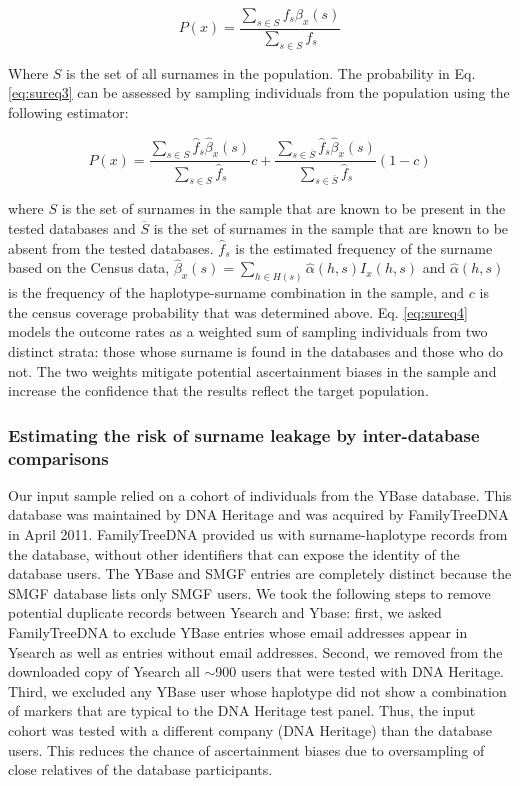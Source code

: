 \begin{equation}
\label{eq:sureq3}
P(x) = \frac
{\sum_{s \in S} f_s \beta_x(s)}
{\sum_{s \in S} f_s}
\end{equation}

Where $S$ is the set of all surnames in the population. The probability in Eq. \ref{eq:sureq3} can be assessed by sampling individuals from the population using the following estimator:

\begin{equation}
\label{eq:sureq4}
P(x) = 
\frac{\sum_{s \in S} \hat{f}_s \hat{\beta}_x(s)}
{\sum_{s \in S}\hat{f}_s}c + 
\frac{\sum_{s \in \overline{S}} \hat{f}_s\hat{\beta}_x(s)}
{\sum_{s \in \overline{S}} \hat{f}_s} (1-c)
\end{equation}

where $S$ is the set of surnames in the sample that are known to be present in the tested databases and $\overline{S}$ is the set of surnames in the sample that are known to be absent from the tested databases. $\hat{f}_s$ is the estimated frequency of the surname based on the Census data, $\hat{\beta}_x(s) = \sum_{h \in H(s)} \hat{\alpha}(h,s)I_x(h,s)$ and $\hat{\alpha}(h,s)$  is the frequency of the haplotype-surname combination in the sample, and $c$ is the census coverage probability that was determined above. Eq. \ref{eq:sureq4} models the outcome rates as a weighted sum of sampling individuals from two distinct strata: those whose surname is found in the databases and those who do not. The two weights mitigate potential ascertainment biases in the sample and increase the confidence that the results reflect the target population.

\subsubsection{Estimating the risk of surname leakage by inter-database comparisons}
Our input sample relied on a cohort of individuals from the YBase database. This database was maintained by DNA Heritage and was acquired by FamilyTreeDNA in April 2011. FamilyTreeDNA provided us with surname-haplotype records from the database, without other identifiers that can expose the identity of the database users. The YBase and SMGF entries are completely distinct because the SMGF database lists only SMGF users. We took the following steps to remove potential duplicate records between Ysearch and Ybase: first, we asked FamilyTreeDNA to exclude YBase entries whose email addresses appear in Ysearch as well as entries without email addresses. Second, we removed from the downloaded copy of Ysearch all $\sim$900 users that were tested with DNA Heritage. Third, we excluded any YBase user whose haplotype did not show a combination of markers that are typical to the DNA Heritage test panel. Thus, the input cohort was tested with a different company (DNA Heritage) than the database users. This reduces the chance of ascertainment biases due to oversampling of close relatives of the database participants.

